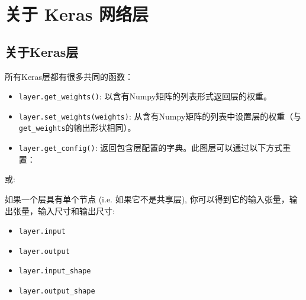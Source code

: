 \section{关于 Keras 网络层}\label{ux5173ux4e8ekerasux5c42}
\subsection{关于Keras层}
所有Keras层都有很多共同的函数：

\begin{itemize}
\tightlist
\item
  \texttt{layer.get\_weights()}: 以含有Numpy矩阵的列表形式返回层的权重。
\item
  \texttt{layer.set\_weights(weights)}:
  从含有Numpy矩阵的列表中设置层的权重（与\texttt{get\_weights}的输出形状相同）。
\item
  \texttt{layer.get\_config()}:
  返回包含层配置的字典。此图层可以通过以下方式重置：
\end{itemize}

\begin{Shaded}
\begin{Highlighting}[]
\OperatorTok{=} \NormalTok{)}
\OperatorTok{=} 
\OperatorTok{=} 
\end{Highlighting}
\end{Shaded}

或:

\begin{Shaded}
\begin{Highlighting}[]
  

\OperatorTok{=} 
\OperatorTok{=} \NormalTok{,}
\end{Highlighting}
\end{Shaded}

如果一个层具有单个节点 (i.e. 如果它不是共享层),
你可以得到它的输入张量，输出张量，输入尺寸和输出尺寸:

\begin{itemize}
\tightlist
\item
  \texttt{layer.input}
\item
  \texttt{layer.output}
\item
  \texttt{layer.input\_shape}
\item
  \texttt{layer.output\_shape}
\end{itemize}


